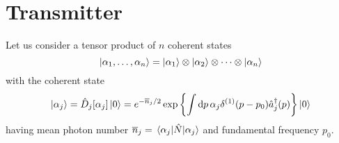 \section{Transmitter}

Let us consider a tensor product of $n$ coherent states
\begin{equation}
	\ket{\alpha_1,\dots,\alpha_n}
	=
	\ket{\alpha_1}
	\otimes
	\ket{\alpha_2}
	\otimes
	\cdots
	\otimes
	\ket{\alpha_n}
\end{equation}
with the coherent state 
\begin{equation}
	\ket{\alpha_j}
	=
	\hat{D}_j[\alpha_j]
	\ket{0}
	=
	e^{-\overline{n}_j/2}
	\exp\left\{
		\int\dd{p}
		\alpha_j
		\delta^{(1)}(p-p_0)
		\hat{a}_j^\dagger(p)
	\right\}
	\ket{0}
\end{equation}
having mean photon number $\overline{n}_j=\expval{\hat{N}}{\alpha_j}$ and fundamental frequency $p_0$.






